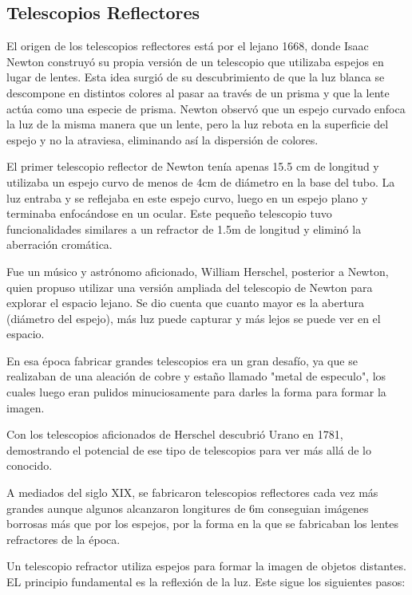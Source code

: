 \subsection{Telescopios Reflectores}

El origen de los telescopios reflectores está por el lejano 1668, donde Isaac Newton construyó su propia versión de un telescopio que utilizaba espejos en lugar de lentes. Esta idea surgió de su descubrimiento de que la luz blanca se descompone en distintos colores al pasar aa través de un prisma y que la lente actúa como una especie de prisma. Newton observó que un espejo curvado enfoca la luz de la misma manera que un lente, pero la luz rebota en la superficie del espejo y no la atraviesa, eliminando así la dispersión de colores. 

El primer telescopio reflector de Newton tenía apenas 15.5 cm de longitud y utilizaba un espejo curvo de menos de 4cm de diámetro en la base del tubo. La luz entraba y se reflejaba en este espejo curvo, luego en un espejo plano y terminaba enfocándose en un ocular. Este pequeño telescopio tuvo funcionalidades similares a un refractor de 1.5m de longitud y eliminó la aberración cromática. 

Fue un músico y astrónomo aficionado, William Herschel, posterior a Newton, quien propuso utilizar una versión ampliada del telescopio de Newton para explorar el espacio lejano. Se dio cuenta que cuanto mayor es la abertura (diámetro del espejo), más luz puede capturar y más lejos se puede ver en el espacio. 

En esa época fabricar grandes telescopios era un gran desafío, ya que se realizaban de una aleación de cobre y estaño llamado "metal de especulo", los cuales luego eran pulidos minuciosamente para darles la forma para formar la imagen. 

Con los telescopios aficionados de Herschel descubrió Urano en 1781, demostrando el potencial de ese tipo de telescopios para ver más allá de lo conocido. 

A mediados del siglo XIX, se fabricaron telescopios reflectores cada vez más grandes aunque algunos alcanzaron longitures de 6m conseguian imágenes borrosas más que por los espejos, por la forma en la que se fabricaban los lentes refractores de la época. 

Un telescopio refractor utiliza espejos para formar la imagen de objetos distantes. EL principio fundamental es la reflexión de la luz. Este sigue los siguientes pasos:

